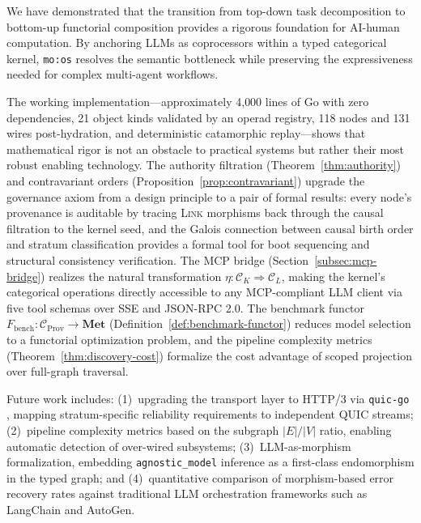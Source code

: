 \documentclass[submission,copyright,creativecommons]{eptcs}
\begin{document}
We have demonstrated that the transition from top-down task decomposition to
bottom-up functorial composition provides a rigorous foundation for
AI-human computation. By anchoring LLMs as coprocessors within a typed
categorical kernel, \texttt{mo:os} resolves the semantic bottleneck while
preserving the expressiveness needed for complex multi-agent workflows.

The working implementation---approximately 4{,}000 lines of Go with zero
dependencies, 21 object kinds validated by an operad registry, 118 nodes and
131 wires post-hydration, and deterministic catamorphic replay---shows that
mathematical rigor is not an obstacle to practical systems but rather their
most robust enabling technology.
The authority filtration (Theorem~\ref{thm:authority}) and contravariant
orders (Proposition~\ref{prop:contravariant}) upgrade the governance axiom
from a design principle to a pair of formal results: every node's provenance
is auditable by tracing \textsc{Link} morphisms back through the causal
filtration to the kernel seed, and the Galois connection between causal birth
order and stratum classification provides a formal tool for boot sequencing
and structural consistency verification.
The MCP bridge (Section~\ref{subsec:mcp-bridge}) realizes the natural
transformation $\eta\colon \mathcal{C}_K \Rightarrow \mathcal{C}_L$, making
the kernel's categorical operations directly accessible to any MCP-compliant
LLM client via five tool schemas over SSE and JSON-RPC 2.0. The benchmark
functor $F_{\mathrm{bench}}\colon \mathcal{C}_{\mathrm{Prov}} \to
\mathbf{Met}$ (Definition~\ref{def:benchmark-functor}) reduces model selection
to a functorial optimization problem, and the pipeline complexity metrics
(Theorem~\ref{thm:discovery-cost}) formalize the cost advantage of scoped
projection over full-graph traversal.

Future work includes:
(1)~upgrading the transport layer to HTTP/3 via \texttt{quic-go}
\cite{rfc9114}, mapping stratum-specific reliability requirements to
independent QUIC streams;
(2)~pipeline complexity metrics based on the subgraph $|E|/|V|$ ratio,
enabling automatic detection of over-wired subsystems;
(3)~LLM-as-morphism formalization, embedding \texttt{agnostic\_model} inference
as a first-class endomorphism in the typed graph;
and (4)~quantitative comparison of morphism-based error recovery rates against
traditional LLM orchestration frameworks such as LangChain and AutoGen.



\end{document}
